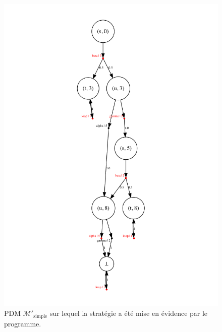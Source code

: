 \documentclass[12pt,a4paper]{report}
\theoremstyle{definition}%
\theoremstyle{remark}
\begin{document}
\begin{figure}
\begin{minipage}{0.5\textwidth}
		\includegraphics[scale=0.5]{figures/simple_mdp2.pdf}
		\caption{PDM $\mathcal{M}'_{\text{simple}}$ sur lequel la stratégie a été mise en évidence par le programme.}
		\label{strat-sspp-figure}
	\end{minipage}
\end{figure}
\end{document}
